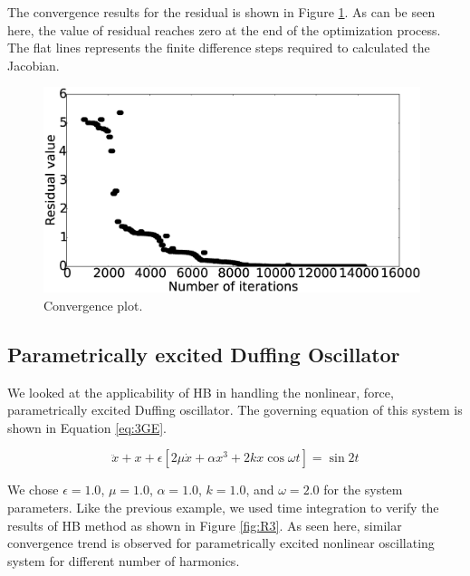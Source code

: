 \documentclass[12pt, a4paper]{extarticle}
\begin{document}
The convergence results for the residual is shown in Figure \ref{fig:R2_convergence}. As can be seen here, the value of residual reaches zero at the end of the optimization process. The flat lines represents the finite difference steps required to calculated the Jacobian.

\begin{figure}[h]
	\centering
	\includegraphics[height=6.00cm]{figure/convergence_study_32.eps}
	\caption{Convergence plot.}
	\label{fig:R2_convergence}
\end{figure}

\subsection{Parametrically excited Duffing Oscillator}
We looked at the applicability of HB in handling the nonlinear, force, parametrically excited Duffing oscillator. The governing equation of this system is shown in Equation \eqref{eq:3GE}.

\begin{equation}\label{eq:3GE}
	\ddot{x} + x + \epsilon \left[ 2 \mu \dot{x} + \alpha x^3 + 2 k x \cos \omega t \right] = \sin 2t	
\end{equation}

We chose $\epsilon = 1.0$, $\mu = 1.0$, $\alpha = 1.0$, $k = 1.0$, and $\omega = 2.0$ for the system parameters. Like the previous example, we used time integration to verify the results of HB method as shown in Figure \ref{fig:R3}. As seen here, similar convergence trend is observed for parametrically excited nonlinear oscillating system for different number of harmonics.
\end{document}
